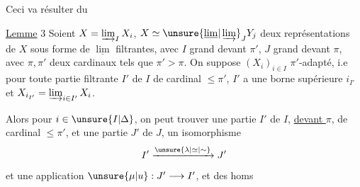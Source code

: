 Ceci va résulter du

\uline{Lemme} 3 Soient $X=\varinjlim_I X_i$, $X\simeq\unsure{\underline{\lim}|\varinjlim}_JY_j$ deux représentations de $X$ sous forme de $\underline{\lim}$ filtrantes, avec $I$ grand devant $\pi'$, $J$ grand devant $\pi$, avec $\pi,\pi'$ deux cardinaux tels que $\pi'>\pi$. On suppose $(X_i)_{i\in I}$ $\pi'$-adapté, i.e pour toute partie filtrante $I'$ de $I$ de cardinal $\leq\pi'$, $I'$ a une borne supérieure $i_{I'}$ et $X_{i_{I'}}=\varinjlim_{i\in I'}X_i$.

Alors pour  $i\in\unsure{I|\Delta}$, on peut trouver une partie $I'$ de $I$,  \uline{ devant $\pi$}, de cardinal $\leq\pi'$,  et une partie $J'$ de $J$,    un isomorphisme
\[
I'\xrightarrow{\unsure{\lambda|\simeq|\sim}}J'
\]
et une application   $\unsure{\mu|u}:J'\longrightarrow I'$,  et des homs

